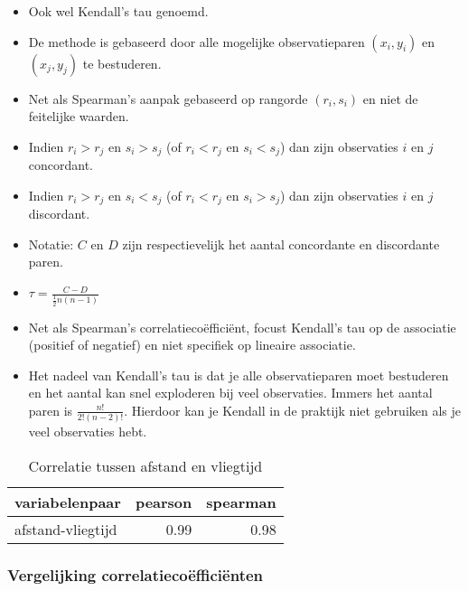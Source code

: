 \documentclass[]{memoir}
\providecommand{\tightlist}{%
  \setlength{\itemsep}{0pt}\setlength{\parskip}{0pt}}
\begin{document}
\begin{itemize}
  \begin{itemize}
  \tightlist
  \item
    Ook wel Kendall's tau genoemd.
  \item
    De methode is gebaseerd door alle mogelijke observatieparen
    \((x_i, y_i)\) en \((x_j,y_j)\) te bestuderen.
  \item
    Net als Spearman's aanpak gebaseerd op rangorde \((r_i, s_i)\) en
    niet de feitelijke waarden.
  \item
    Indien \(r_i > r_j\) en \(s_i > s_j\) (of \(r_i < r_j\) en
    \(s_i < s_j\)) dan zijn observaties \(i\) en \(j\) concordant.
  \item
    Indien \(r_i > r_j\) en \(s_i < s_j\) (of \(r_i < r_j\) en
    \(s_i > s_j\)) dan zijn observaties \(i\) en \(j\) discordant.
  \item
    Notatie: \(C\) en \(D\) zijn respectievelijk het aantal concordante
    en discordante paren.
  \item
    \(\tau = \frac{C-D}{\frac{1}{2}n(n-1)}\)
  \item
    Net als Spearman's correlatiecoëfficiënt, focust Kendall's tau op de
    associatie (positief of negatief) en niet specifiek op lineaire
    associatie.
  \item
    Het nadeel van Kendall's tau is dat je alle observatieparen moet
    bestuderen en het aantal kan snel exploderen bij veel observaties.
    Immers het aantal paren is \(\frac{n!}{2!(n-2)!}\). Hierdoor kan je
    Kendall in de praktijk niet gebruiken als je veel observaties hebt.
  \end{itemize}
\end{itemize}

\begin{table}[t]

\caption{\label{tab:4-12}Correlatie tussen afstand en vliegtijd}
\centering
\fontsize{10}{12}\selectfont
\begin{tabular}{lrr}
\toprule
variabelenpaar & pearson & spearman\\
\midrule
afstand-vliegtijd & 0.99 & 0.98\\
\bottomrule
\end{tabular}
\end{table}

\subsubsection*{Vergelijking
correlatiecoëfficiënten}\label{vergelijking-correlatiecoefficienten}
\end{document}
